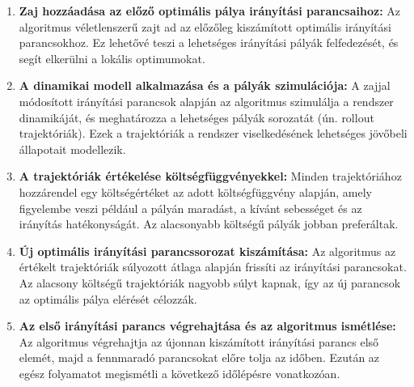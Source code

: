 \begin{enumerate}
    \item \textbf{Zaj hozzáadása az előző optimális pálya irányítási parancsaihoz:}
    Az algoritmus véletlenszerű zajt ad az előzőleg kiszámított optimális irányítási parancsokhoz. Ez lehetővé teszi a lehetséges irányítási pályák felfedezését, és segít elkerülni a lokális optimumokat.

    \item \textbf{A dinamikai modell alkalmazása és a pályák szimulációja:}
    A zajjal módosított irányítási parancsok alapján az algoritmus szimulálja a rendszer dinamikáját, és meghatározza a lehetséges pályák sorozatát (ún. rollout trajektóriák). Ezek a trajektóriák a rendszer viselkedésének lehetséges jövőbeli állapotait modellezik.

    \item \textbf{A trajektóriák értékelése költségfüggvényekkel:}
    Minden trajektóriához hozzárendel egy költségértéket az adott költségfüggvény alapján, amely figyelembe veszi például a pályán maradást, a kívánt sebességet és az irányítás hatékonyságát. Az alacsonyabb költségű pályák jobban preferáltak.

    \item \textbf{Új optimális irányítási parancssorozat kiszámítása:}
    Az algoritmus az értékelt trajektóriák súlyozott átlaga alapján frissíti az irányítási parancsokat. Az alacsony költségű trajektóriák nagyobb súlyt kapnak, így az új parancsok az optimális pálya elérését célozzák.

    \item \textbf{Az első irányítási parancs végrehajtása és az algoritmus ismétlése:}
    Az algoritmus végrehajtja az újonnan kiszámított irányítási parancs első elemét, majd a fennmaradó parancsokat előre tolja az időben. Ezután az egész folyamatot megismétli a következő időlépésre vonatkozóan.
\end{enumerate}
